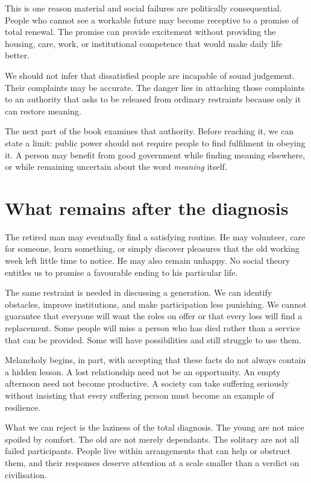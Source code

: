 \documentclass[12pt,a4paper]{book}
\begin{document}
This is one reason material and social failures are politically consequential. People who cannot see a workable future may become receptive to a promise of total renewal. The promise can provide excitement without providing the housing, care, work, or institutional competence that would make daily life better.

We should not infer that dissatisfied people are incapable of sound judgement. Their complaints may be accurate. The danger lies in attaching those complaints to an authority that asks to be released from ordinary restraints because only it can restore meaning.

The next part of the book examines that authority. Before reaching it, we can state a limit: public power should not require people to find fulfilment in obeying it. A person may benefit from good government while finding meaning elsewhere, or while remaining uncertain about the word \emph{meaning} itself.

\section*{What remains after the diagnosis}

The retired man may eventually find a satisfying routine. He may volunteer, care for someone, learn something, or simply discover pleasures that the old working week left little time to notice. He may also remain unhappy. No social theory entitles us to promise a favourable ending to his particular life.

The same restraint is needed in discussing a generation. We can identify obstacles, improve institutions, and make participation less punishing. We cannot guarantee that everyone will want the roles on offer or that every loss will find a replacement. Some people will miss a person who has died rather than a service that can be provided. Some will have possibilities and still struggle to use them.

Melancholy begins, in part, with accepting that these facts do not always contain a hidden lesson. A lost relationship need not be an opportunity. An empty afternoon need not become productive. A society can take suffering seriously without insisting that every suffering person must become an example of resilience.

What we can reject is the laziness of the total diagnosis. The young are not mice spoiled by comfort. The old are not merely dependants. The solitary are not all failed participants. People live within arrangements that can help or obstruct them, and their responses deserve attention at a scale smaller than a verdict on civilisation.
\end{document}
